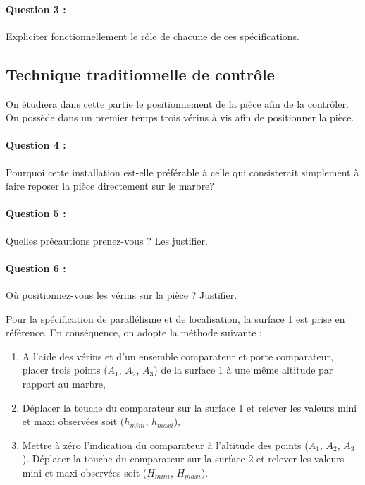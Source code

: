 \paragraph{Question 3 :} Expliciter fonctionnellement le rôle de chacune de ces spécifications.


\subsection{Technique traditionnelle de contrôle}

On étudiera dans cette partie le positionnement de la pièce afin de la contrôler. On possède dans un premier temps trois vérins à vis afin de positionner la pièce.


\paragraph{Question 4 :} Pourquoi cette installation est-elle préférable à celle qui consisterait simplement à
faire reposer la pièce directement sur le marbre?

\paragraph{Question 5 :} Quelles précautions prenez-vous ? Les justifier.

\paragraph{Question 6 :} Où positionnez-vous les vérins sur la pièce ? Justifier.

\newpage

Pour la spécification de parallélisme et de localisation, la surface 1 est prise en référence. En
conséquence, on adopte la méthode suivante :

\begin{enumerate}
 \item A l'aide des vérins et d'un ensemble comparateur et porte comparateur, placer trois
points ($A_1$, $A_2$, $A_3$) de la surface 1 à une même altitude par rapport au marbre,
 \item Déplacer la touche du comparateur sur la surface 1 et relever les valeurs mini et maxi
observées soit ($h_{mini}$, $h_{maxi}$),
 \item Mettre à zéro l'indication du comparateur à l'altitude des points ($A_1$, $A_2$, $A_3$). Déplacer la
touche du comparateur sur la surface 2 et relever les valeurs mini et maxi observées soit ($H_{mini}$, $H_{maxi}$).
\end{enumerate}

